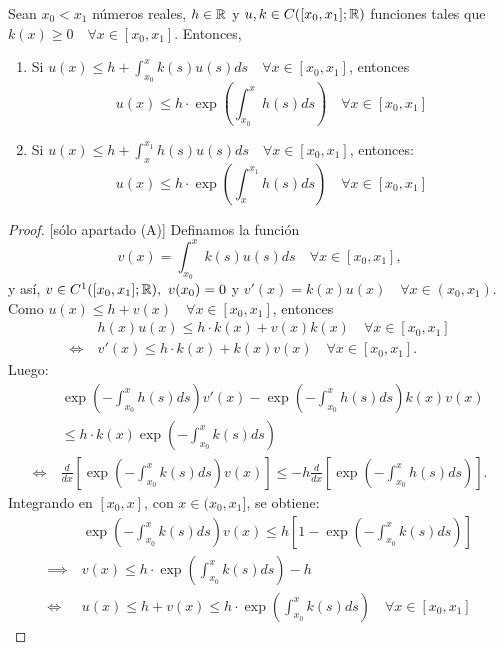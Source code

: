 \begin{lemma}[Grönwall]
	Sean $x_0 < x_1$ números reales, $h \in \mathbb{R}$ y $u,k \in C([x_0,x_1];\mathbb{R})$ funciones tales que $k(x) \geq 0 \quad \forall x \in [x_0,x_1]$. Entonces,
	\begin{enumerate}
		\item[(A)] Si $u(x) \leq h + \int_{x_{0}}^{x} k(s)u(s) ds \quad \forall x \in [x_0,x_1]$, entonces
		\[ u(x) \leq h\cdot \exp\left( \int_{x_{0}}^{x} h(s)ds \right) \quad \forall x \in [x_{0},x_{1}] \]

		\item [(B)] Si $u(x) \leq h + \int_{x}^{x_{1}}h(s)u(s)ds \quad \forall x \in [x_{0},x_{1}]$, entonces:
		\[ u(x) \leq h \cdot \exp \left( \int_{x}^{x_{1}}h(s)ds \right) \quad \forall x \in [x_{0},x_{1}] \]
	\end{enumerate}
\end{lemma}
\begin{proof}[Proof][sólo apartado (A)]
	Definamos la función 
	\[ v(x) = \int_{x_{0}}^{x} k(s)u(s)ds \quad \forall x \in [x_{0},x_{1}], \]
	y así, $v \in C^1([x_{0},x_{1}];\mathbb{R}),\ v(x_{0}) = 0$ y $v'(x) = k(x)u(x) \quad \forall x \in (x_{0},x_{1})$. Como $u(x) \leq h + v(x) \quad \forall x \in [x_{0},x_{1}]$, entonces
	\begin{align*}
		& h(x)u(x) \leq h\cdot k(x) + v(x)k(x) \quad \forall x \in [x_{0},x_{1}] \\
		\iff \ & v'(x) \leq h\cdot k(x) + k(x)v(x) \quad \forall x \in [x_{0},x_{1}]
	.\end{align*}
	Luego:
	\begin{align*}
		& \exp \left( - \int_{x_{0}}^{x} h(s)ds \right) v'(x) - \exp \left(- \int_{x_{0}}^{x}h(s)ds \right)k(x)v(x) \\
		& \leq h\cdot k(x) \exp \left( - \int_{x_{0}}^{x} k(s)ds \right) \\
		\iff \ & \frac{d}{dx} \left[ \exp \left(-\int_{x_{0}}^{x}k(s)ds\right)v(x) \right] \leq -h \frac{d}{dx} \left[ \exp \left( - \int_{x_{0}}^{x} h(s)ds \right) \right]
	.\end{align*}
	Integrando en $[x_{0},x]$, con $x \in (x_{0},x_{1}]$, se obtiene:
	\begin{align*}
		& \exp \left( -\int_{x_{0}}^{x}k(s)ds \right) v(x) \leq h \left[ 1 - \exp \left( -\int_{x_{0}}^{x} k(s)ds \right) \right] \\
		\implies \ & v(x) \leq h \cdot \exp \left( \int_{x_{0}}^{x} k(s)ds \right) -h \\
		\iff \ & u(x) \leq h + v(x) \leq h \cdot \exp \left( \int_{x_{0}}^{x}k(s)ds \right) \quad \forall x \in [x_{0},x_{1}]
	\end{align*}
\end{proof}

